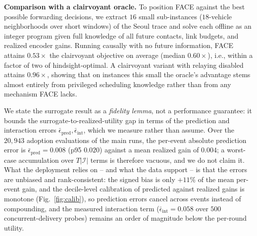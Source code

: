 \textbf{Comparison with a clairvoyant oracle.}
To position FACE against the best possible forwarding decisions, we
extract $16$ small sub-instances ($18$-vehicle neighborhoods over short
windows) of the Seoul trace and solve each offline as an integer
program given full knowledge of all future contacts, link budgets, and
realized encoder gains. Running causally with no future information,
FACE attains $0.53\times$ the clairvoyant objective on average (median
$0.60\times$), i.e., within a factor of two of hindsight-optimal. A
clairvoyant variant with relaying disabled attains $0.96\times$,
showing that on instances this small the oracle's advantage stems
almost entirely from privileged scheduling knowledge rather than from
any mechanism FACE lacks.

We state the surrogate result as a \emph{fidelity lemma}, not a
performance guarantee: it bounds the surrogate-to-realized-utility gap
in terms of the prediction and interaction errors
$\bar\epsilon_{\mathrm{pred}},\bar\epsilon_{\mathrm{int}}$, which we
measure rather than assume. Over the $20{,}943$ adoption evaluations of
the main runs, the per-event absolute prediction error is
$\bar\epsilon_{\mathrm{pred}}{=}0.008$ (p95 $0.020$) against a mean
realized gain of $0.004$; a worst-case accumulation over
$T|\mathcal I|$ terms is therefore vacuous, and we do not claim it.
What the deployment relies on -- and what the data support -- is that
the errors are unbiased and rank-consistent: the signed bias is only
$+11\%$ of the mean per-event gain, and the decile-level calibration of
predicted against realized gains is monotone
(Fig.~\ref{fig:calib}), so prediction errors cancel across events
instead of compounding, and the measured interaction term
($\bar\epsilon_{\mathrm{int}}{=}0.058$ over $500$ concurrent-delivery
probes) remains an order of magnitude below the per-round utility.

